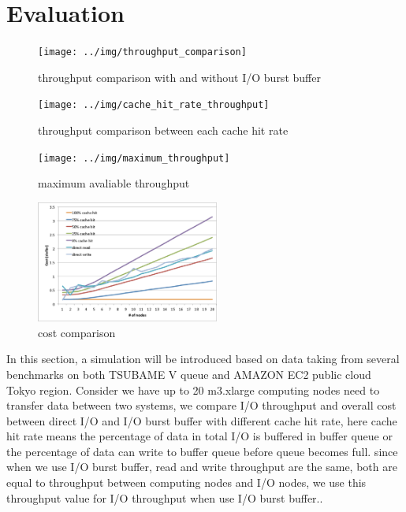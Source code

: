 \section{Evaluation}
\label{sec:evaluation}

\begin{figure}[tb]
	\centering
	\texttt{[image: ../img/throughput\_comparison]}
	\caption{throughput comparison with and without I/O burst buffer}
	\label{throughput comparison}
\end{figure}

\begin{figure}[tb]
	\centering
	\texttt{[image: ../img/cache\_hit\_rate\_throughput]}
	\caption{throughput comparison between each cache hit rate}
	\label{throughput cache rate}
\end{figure}

\begin{figure}[tb]
	\centering
	\texttt{[image: ../img/maximum\_throughput]}
	\caption{maximum avaliable throughput}
	\label{maximum throughput}
\end{figure}

\begin{figure}[tb]
	\centering
	\includegraphics[width=6cm]{../img/cost}
	\caption{cost comparison}
	\label{cost}
\end{figure}


In this section, a simulation will be introduced based on data taking from several benchmarks on both TSUBAME V queue and AMAZON EC2 public cloud Tokyo region.%
Consider we have up to 20 m3.xlarge computing nodes need to transfer data between two systems, we compare I/O throughput and overall cost between direct I/O and I/O burst buffer with different cache hit rate, here cache hit rate means the percentage of data in total I/O is buffered in buffer queue or the percentage of data can write to buffer queue before queue becomes full.
since when we use I/O burst buffer, read and write throughput are the same, both are equal to throughput between computing nodes and I/O nodes,  we use this throughput value for I/O throughput when use I/O burst buffer..

